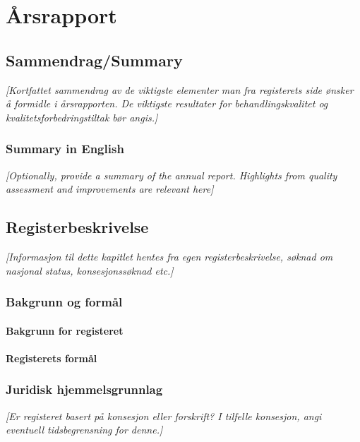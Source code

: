 \documentclass[norsk, a4paper, twocolumn]{report}
\newcommand{\guide}[1] {
	\textit{[\textcolor{guidegray}{#1}]}
	}
\begin{document}
\tableofcontents




\part{Årsrapport}\label{par:rap}
\thispagestyle{empty}
\twocolumn



\chapter{Sammendrag/Summary}
\guide{Kortfattet sammendrag av de viktigste elementer man fra registerets side
ønsker å formidle i årsrapporten. De viktigste resultater for
behandlingskvalitet og kvalitetsforbedringstiltak bør angis.}

\section*{Summary in English}
\guide{Optionally, provide a summary of the annual report. Highlights from
quality assessment and improvements are relevant here}


\chapter{Registerbeskrivelse}\label{cha:reg}
\guide{Informasjon til dette kapitlet hentes fra egen registerbeskrivelse,
søknad om nasjonal status, konsesjonssøknad etc.}

\section{Bakgrunn og formål}
\subsection{Bakgrunn for registeret}\label{sec:bak}
\subsection{Registerets formål}\label{sec:for}

\section{Juridisk hjemmelsgrunnlag}\label{cha:jur}
\guide{Er registeret basert på konsesjon eller forskrift? I tilfelle
konsesjon, angi eventuell tidsbegrensning for denne.}
\end{document}
